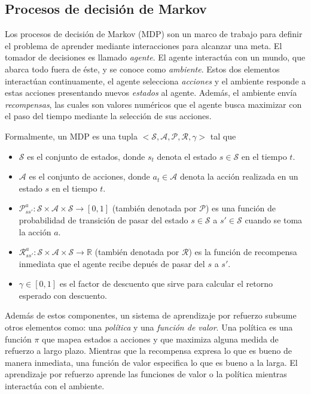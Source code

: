 \subsection{Procesos de decisión de Markov}


Los procesos de decisión de Markov (MDP) son un marco de trabajo para
definir el problema de aprender
mediante interacciones para 
alcanzar una meta. El tomador de 
decisiones es llamado \textit{agente}.
El agente interactúa con un mundo, que
abarca todo fuera de éste, y se
conoce como \textit{ambiente}.
Estos dos elementos
interactúan continuamente, el agente
selecciona \textit{acciones} y
el ambiente responde a estas 
acciones presentando nuevos 
\textit{estados} al agente. Además,
el ambiente envía \textit{recompensas},
las cuales son valores numéricos 
que el agente busca maximizar con
el paso del tiempo mediante la 
selección de sus acciones.

Formalmente, un MDP es una tupla $< \mathcal{S}, \mathcal{A}, \mathcal{P}, \mathcal{R}, \gamma>$ tal que

\begin{itemize}
    \item $\mathcal{S}$ es el conjunto de estados, donde $s_t$ denota el estado $s\in \mathcal{S}$ en el tiempo $t$.
    \item $\mathcal{A}$ es el conjunto de acciones, donde $a_t \in \mathcal{A}$
    denota la acción realizada en un estado $s$ en el tiempo $t$.
    \item $\mathcal{P}_{ss'}^{a}: \mathcal{S}\times \mathcal{A} \times \mathcal{S} \rightarrow [0, 1]$ (también denotada por $\mathcal{P}$) es una función de probabilidad de transición de pasar del estado $s \in \mathcal{S}$ a $s' \in \mathcal{S}$ cuando se toma la acción $a$.%
    \item $\mathcal{R}_{ss'}^{a}: \mathcal{S} \times \mathcal{A} \times \mathcal{S} \rightarrow \mathbb{R}$ (también denotada por $\mathcal{R}$) es la función de recompensa inmediata que el agente recibe depués de pasar del $s$ a $s'$.
    \item $\gamma \in [0,1]$ es el factor de descuento que sirve para
    calcular el retorno esperado con descuento.
\end{itemize}


Además de estos componentes, un sistema de aprendizaje por refuerzo subsume otros elementos como: una \textit{política} y una \textit{función de valor}. Una política es una función $\pi$ que mapea estados
a acciones y que maximiza alguna medida de refuerzo a largo plazo. Mientras que la recompensa expresa lo que es bueno
de manera inmediata, una función de valor especifica lo que
es bueno a la larga. 
El aprendizaje por refuerzo aprende las funciones de valor o la política mientras 
interactúa con el ambiente.

